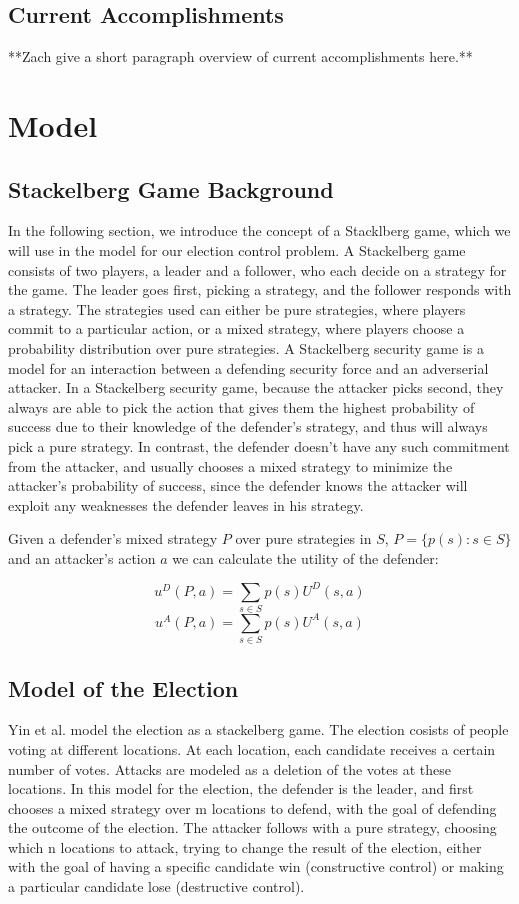 \documentclass[letterpaper]{article} %
\begin{document}
\subsection{Current Accomplishments}
**Zach give a short paragraph overview of current accomplishments here.**

\section{Model}
\subsection{Stackelberg Game Background}
In the following section, we introduce the concept of a Stacklberg game, which we will use in the model for our election control problem. A Stackelberg game consists of two players, a leader and a follower, who each decide on a strategy for the game. The leader goes first, picking a strategy, and the follower responds with a strategy. The strategies used can either be pure strategies, where players commit to a particular action, or a mixed strategy, where players choose a probability distribution over pure strategies. A Stackelberg security game is a model for an interaction between a defending security force and an adverserial attacker. In a Stackelberg security game, because the attacker picks second, they always are able to pick the action that gives them the highest probability of success due to their knowledge of the defender's strategy, and thus will always pick a pure strategy. In contrast, the defender doesn't have any such commitment from the attacker, and usually chooses a mixed strategy to minimize the attacker's probability of success, since the defender knows the attacker will exploit any weaknesses the defender leaves in his strategy. 

Given a defender's mixed strategy $P$ over pure strategies in $S$, $P = \{p(s) : s \in S\}$ and an attacker's action $a$ we can calculate the utility of the defender:

\begin{equation}
u^D(P,a) = \sum_{s \in S}p(s)U^D(s,a)
\end{equation}
\begin{equation}
u^A(P,a) = \sum_{s \in S}p(s)U^A(s,a)
\end{equation}

\subsection{Model of the Election}
Yin et al. model the election as a stackelberg game. The election cosists of people voting at different locations. At each location, each candidate receives a certain number of votes. Attacks are modeled as a deletion of the votes at these locations. In this model for the election, the defender is the leader, and first chooses a mixed strategy over m locations to defend,  with the goal of defending the outcome of the election. The attacker follows with a pure strategy, choosing which n locations to attack, trying to change the result of the election, either with the goal of having a specific candidate win (constructive control) or making a particular candidate lose (destructive control). 
\end{document}
